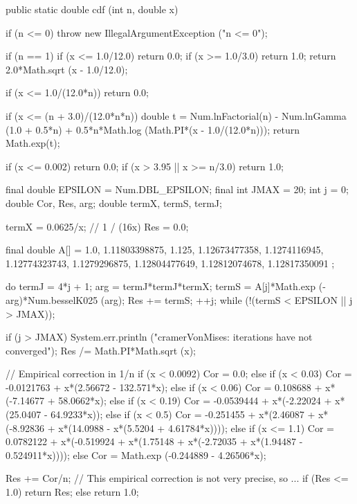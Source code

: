 \begin{code}

   public static double cdf (int n, double x)\begin{hide} {
      if (n <= 0)
         throw new IllegalArgumentException ("n <= 0");

      if (n == 1) {
         if (x <= 1.0/12.0)
            return 0.0;
         if (x >= 1.0/3.0)
            return 1.0;
         return 2.0*Math.sqrt (x - 1.0/12.0);
      }

      if (x <= 1.0/(12.0*n))
         return 0.0;

      if (x <= (n + 3.0)/(12.0*n*n)) {
         double t = Num.lnFactorial(n) - Num.lnGamma (1.0 + 0.5*n) +
            0.5*n*Math.log (Math.PI*(x - 1.0/(12.0*n)));
         return Math.exp(t);
      }

      if (x <= 0.002)
         return 0.0;
      if (x > 3.95 || x >= n/3.0)
         return 1.0;

      final double EPSILON = Num.DBL_EPSILON;
      final int JMAX = 20;
      int j = 0;
      double Cor, Res, arg;
      double termX, termS, termJ;

      termX = 0.0625/x;            // 1 / (16x)
      Res = 0.0;

      final double A[] = {
         1.0,
         1.11803398875,
         1.125,
         1.12673477358,
         1.1274116945,
         1.12774323743,
         1.1279296875,
         1.12804477649,
         1.12812074678,
         1.12817350091
      };

      do {
         termJ = 4*j + 1;
         arg = termJ*termJ*termX;
         termS = A[j]*Math.exp (-arg)*Num.besselK025 (arg);
         Res += termS;
         ++j;
      } while (!(termS < EPSILON || j > JMAX));

      if (j > JMAX)
         System.err.println ("cramerVonMises: iterations have not converged");
      Res /= Math.PI*Math.sqrt (x);

      // Empirical correction in 1/n
      if (x < 0.0092)
         Cor = 0.0;
      else if (x < 0.03)
         Cor = -0.0121763 + x*(2.56672 - 132.571*x);
      else if (x < 0.06)
         Cor = 0.108688 + x*(-7.14677 + 58.0662*x);
      else if (x < 0.19)
         Cor = -0.0539444 + x*(-2.22024 + x*(25.0407 - 64.9233*x));
      else if (x < 0.5)
         Cor = -0.251455 + x*(2.46087 + x*(-8.92836 + x*(14.0988 -
                  x*(5.5204 + 4.61784*x))));
      else if (x <= 1.1)
         Cor = 0.0782122 + x*(-0.519924 + x*(1.75148 +
               x*(-2.72035 + x*(1.94487 - 0.524911*x))));
      else
         Cor = Math.exp (-0.244889 - 4.26506*x);

      Res += Cor/n;
      // This empirical correction is not very precise, so ...
      if (Res <= 1.0)
         return Res;
      else
         return 1.0;
   }\end{hide}
\end{code}
